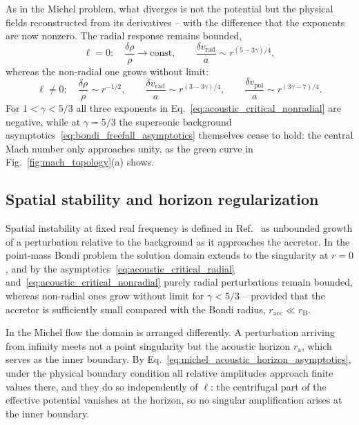 \documentclass[12pt,a4paper,preprint,nopreprintline]{elsarticle}
\begin{document}
As in the Michel problem, what diverges is not the potential but the physical fields reconstructed from its derivatives -- with the difference that the exponents are now nonzero. The radial response remains bounded,
\begin{equation}
    \ell=0:
    \quad
    \frac{\delta\rho}{\rho}
    \longrightarrow\mathrm{const},
    \qquad
    \frac{\delta v_{\mathrm{rad}}}{a}
    \sim r^{(5-3\gamma)/4},
    \label{eq:acoustic_critical_radial}
\end{equation}
whereas the non-radial one grows without limit:
\begin{equation}
    \ell\neq0:
    \quad
    \frac{\delta\rho}{\rho}
    \sim r^{-1/2},
    \qquad
    \frac{\delta v_{\mathrm{rad}}}{a}
    \sim r^{(3-3\gamma)/4},
    \qquad
    \frac{\delta v_{\mathrm{pol}}}{a}
    \sim r^{(3\gamma-7)/4}.
    \label{eq:acoustic_critical_nonradial}
\end{equation}
For $1<\gamma<5/3$ all three exponents in Eq.~\eqref{eq:acoustic_critical_nonradial} are negative, while at $\gamma=5/3$ the supersonic background asymptotics~\eqref{eq:bondi_freefall_asymptotics} themselves cease to hold: the central Mach number only approaches unity, as the green curve in Fig.~\ref{fig:mach_topology}(a) shows.

\subsection{Spatial stability and horizon regularization}
\label{sec:acoustic_stability}

Spatial instability at fixed real frequency is defined in Ref.~\cite{KovalenkoIG_EreminMA_SpatialInstabilityOfSphericalAccretion_1998} as unbounded growth of a perturbation relative to the background as it approaches the accretor. In the point-mass Bondi problem the solution domain extends to the singularity at $r=0$, and by the asymptotics~\eqref{eq:acoustic_critical_radial} and~\eqref{eq:acoustic_critical_nonradial} purely radial perturbations remain bounded, whereas non-radial ones grow without limit for $\gamma<5/3$ -- provided that the accretor is sufficiently small compared with the Bondi radius, $r_{\mathrm{acc}}\ll r_{\mathrm{B}}$.

In the Michel flow the domain is arranged differently. A perturbation arriving from infinity meets not a point singularity but the acoustic horizon $r_{\mathrm{a}}$, which serves as the inner boundary. By Eq.~\eqref{eq:michel_acoustic_horizon_asymptotics}, under the physical boundary condition all relative amplitudes approach finite values there, and they do so independently of $\ell$: the centrifugal part of the effective potential vanishes at the horizon, so no singular amplification arises at the inner boundary.
\end{document}
